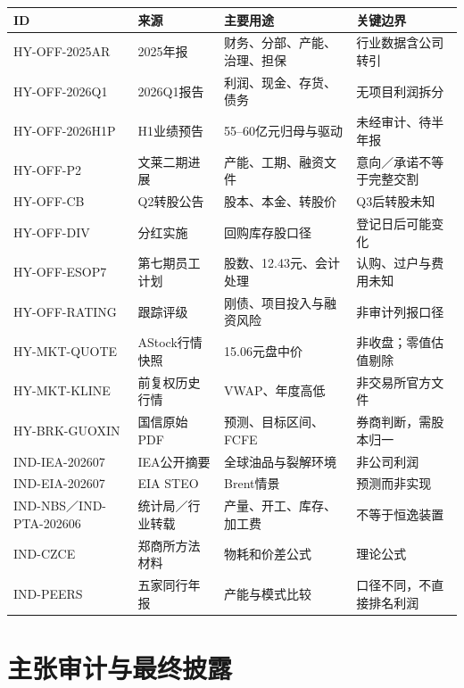 \begin{exhibitbox}[核心来源ID与证据边界]
\scriptsize
\noindent\begin{tabularx}{\textwidth}{L{2.65cm}L{3.2cm}L{2.55cm}X}
\toprule
\textbf{ID} & \textbf{来源} & \textbf{主要用途} & \textbf{关键边界} \\
\midrule
HY-OFF-2025AR & 2025年报 & 财务、分部、产能、治理、担保 & 行业数据含公司转引 \\
HY-OFF-2026Q1 & 2026Q1报告 & 利润、现金、存货、债务 & 无项目利润拆分 \\
HY-OFF-2026H1P & H1业绩预告 & 55--60亿元归母与驱动 & 未经审计、待半年报 \\
HY-OFF-P2 & 文莱二期进展 & 产能、工期、融资文件 & 意向／承诺不等于完整交割 \\
HY-OFF-CB & Q2转股公告 & 股本、本金、转股价 & Q3后转股未知 \\
HY-OFF-DIV & 分红实施 & 回购库存股口径 & 登记日后可能变化 \\
HY-OFF-ESOP7 & 第七期员工计划 & 股数、12.43元、会计处理 & 认购、过户与费用未知 \\
HY-OFF-RATING & 跟踪评级 & 刚债、项目投入与融资风险 & 非审计列报口径 \\
HY-MKT-QUOTE & AStock行情快照 & 15.06元盘中价 & 非收盘；零值估值剔除 \\
HY-MKT-KLINE & 前复权历史行情 & VWAP、年度高低 & 非交易所官方文件 \\
HY-BRK-GUOXIN & 国信原始PDF & 预测、目标区间、FCFE & 券商判断，需股本归一 \\
IND-IEA-202607 & IEA公开摘要 & 全球油品与裂解环境 & 非公司利润 \\
IND-EIA-202607 & EIA STEO & Brent情景 & 预测而非实现 \\
IND-NBS／IND-PTA-202606 & 统计局／行业转载 & 产量、开工、库存、加工费 & 不等于恒逸装置 \\
IND-CZCE & 郑商所方法材料 & 物耗和价差公式 & 理论公式 \\
IND-PEERS & 五家同行年报 & 产能与模式比较 & 口径不同，不直接排名利润 \\
\bottomrule
\end{tabularx}
\end{exhibitbox}

\section{主张审计与最终披露}

